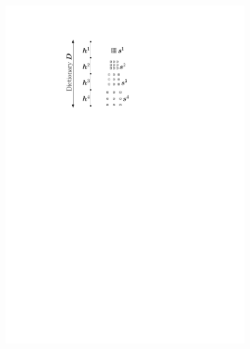 \begin{figure}[!ht]
\begin{subfigure}[b]{0.32\textwidth}
	\includegraphics[width=\textwidth]{figures/xp_explain/dictionary.pdf}
	\caption{}
\end{subfigure}
\begin{subfigure}[b]{0.32\textwidth}\centering

\end{subfigure}
\end{figure}
